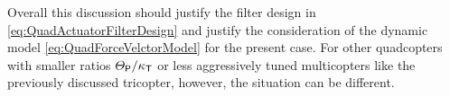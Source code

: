 Overall this discussion should justify the filter design in \eqref{eq:QuadActuatorFilterDesign} and justify the consideration of the dynamic model \eqref{eq:QuadForceVelctorModel} for the present case.
For other quadcopters with smaller ratios $\varTheta_\mathsf{P} / \kappa_{\mathsf{T}}$ or less aggressively tuned multicopters like the previously discussed tricopter, however, the situation can be different.
